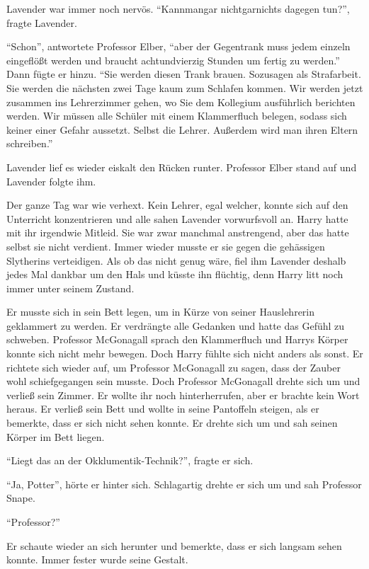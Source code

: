 Lavender war immer noch nervös. \enquote{Kann\abs man\abs gar nicht\abs gar\abs nichts dagegen tun?}, fragte Lavender.

\enquote{Schon}, antwortete Professor Elber, \enquote{aber der Gegentrank muss jedem einzeln eingeflößt werden und braucht achtundvierzig Stunden um fertig zu werden.} Dann fügte er hinzu. \enquote{Sie werden diesen Trank brauen. Sozusagen als Strafarbeit. Sie werden die nächsten zwei Tage kaum zum Schlafen kommen. Wir werden jetzt zusammen ins Lehrerzimmer gehen, wo Sie dem Kollegium ausführlich berichten werden. Wir müssen alle Schüler mit einem Klammerfluch belegen, sodass sich keiner einer Gefahr aussetzt. Selbst die Lehrer. Außerdem wird man ihren Eltern schreiben.}

Lavender lief es wieder eiskalt den Rücken runter. Professor Elber stand auf und Lavender folgte ihm.

Der ganze Tag war wie verhext. Kein Lehrer, egal welcher, konnte sich auf den Unterricht konzentrieren und alle sahen Lavender vorwurfsvoll an. Harry hatte mit ihr irgendwie Mitleid. Sie war zwar manchmal anstrengend, aber das hatte selbst sie nicht verdient. Immer wieder musste er sie gegen die gehässigen Slytherins verteidigen. Als ob das nicht genug wäre, fiel ihm Lavender deshalb jedes Mal dankbar um den Hals und küsste ihn flüchtig, denn Harry litt noch immer unter seinem Zustand.

Er musste sich in sein Bett legen, um in Kürze von seiner Hauslehrerin geklammert zu werden. Er verdrängte alle Gedanken und hatte das Gefühl zu schweben. Professor McGonagall sprach den Klammerfluch  und Harrys Körper konnte sich nicht mehr bewegen. Doch Harry fühlte sich nicht anders als sonst. Er richtete sich wieder auf, um Professor McGonagall zu sagen, dass der Zauber wohl schiefgegangen sein musste. Doch  Professor McGonagall drehte sich um und verließ sein Zimmer. Er wollte ihr noch hinterherrufen, aber er brachte kein Wort heraus. Er verließ sein Bett und wollte in seine Pantoffeln steigen, als er bemerkte, dass er sich nicht sehen konnte. Er drehte sich um und sah seinen Körper im Bett liegen.

\enquote{Liegt das an der Okklumentik-Technik?}, fragte er sich.

\enquote{Ja, Potter}, hörte er hinter sich. Schlagartig drehte er sich um und sah Professor Snape.

\enquote{Professor?}

Er schaute wieder an sich herunter und bemerkte, dass er sich langsam sehen konnte. Immer fester wurde seine Gestalt.

